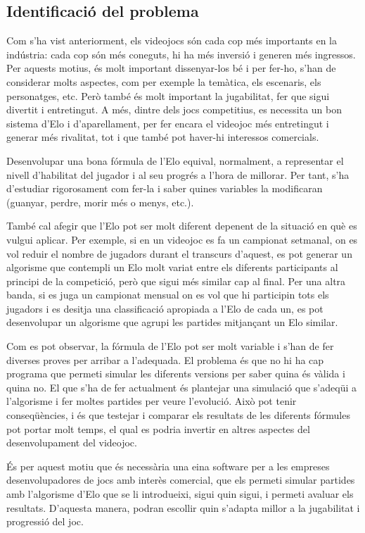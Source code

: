 \documentclass[a4paper]{article}
\begin{document}
\newpage
\subsection{Identificació del problema}
Com s'ha vist anteriorment, els videojocs són cada cop més importants en la indústria: cada cop són més coneguts, hi ha més inversió i generen més ingressos. Per aquests motius, és molt important dissenyar-los bé i per fer-ho, s'han de considerar molts aspectes, com per exemple la temàtica, els escenaris, els personatges, etc. Però també és molt important la jugabilitat, fer que sigui divertit i entretingut. A més, dintre dels jocs competitius, es necessita un bon sistema d'Elo i d'aparellament, per fer encara el videojoc més entretingut i generar més rivalitat, tot i que també pot haver-hi interessos comercials.

Desenvolupar una bona fórmula de l'Elo equival, normalment, a representar el nivell d'habilitat del jugador i al seu progrés a l'hora de millorar. Per tant, s'ha d'estudiar rigorosament com fer-la i saber quines variables la modificaran (guanyar, perdre, morir més o menys, etc.).

També cal afegir que l'Elo pot ser molt diferent depenent de la situació en què es vulgui aplicar. Per exemple, si en un videojoc es fa un campionat setmanal, on es vol reduir el nombre de jugadors durant el transcurs d'aquest, es pot generar un algorisme que contempli un Elo molt variat entre els diferents participants al principi de la competició, però que sigui més similar cap al final. Per una altra banda, si es juga un campionat mensual on es vol que hi participin tots els jugadors i es desitja una classificació apropiada a l'Elo de cada un, es pot desenvolupar un algorisme que agrupi les partides mitjançant un Elo similar.

Com es pot observar, la fórmula de l'Elo pot ser molt variable i s'han de fer diverses proves per arribar a l'adequada. El problema és que no hi ha cap programa que permeti simular les diferents versions per saber quina és vàlida i quina no. El que s'ha de fer actualment és plantejar una simulació que s'adeqüi a l'algorisme i fer moltes partides per veure l'evolució. Això pot tenir conseqüències, i és que testejar i comparar els resultats de les diferents fórmules pot portar molt temps, el qual es podria invertir en altres aspectes del desenvolupament del videojoc. 

És per aquest motiu que és necessària una eina software per a les empreses desenvolupadores de jocs amb interès comercial, que els permeti simular partides amb l'algorisme d'Elo que se li introdueixi, sigui quin sigui, i permeti avaluar els resultats. D'aquesta manera, podran escollir quin s'adapta millor a la jugabilitat i progressió del joc.
\end{document}
